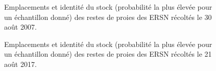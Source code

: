 \label{app:supp-figs}

\begin{figure}[htb]
    \centering
    \caption{Emplacements et identité du stock (probabilité la plus élevée pour un échantillon donné) des restes de proies des ERSN récoltés le 30 août 2007.}
    \label{fig:prey-samples-2007}
\end{figure}

\begin{figure}[htb]
    \centering
    \caption{Emplacements et identité du stock (probabilité la plus élevée pour un échantillon donné) des restes de proies des ERSN récoltés le 21 août 2017.}
    \label{fig:prey-samples-2017}
\end{figure}


